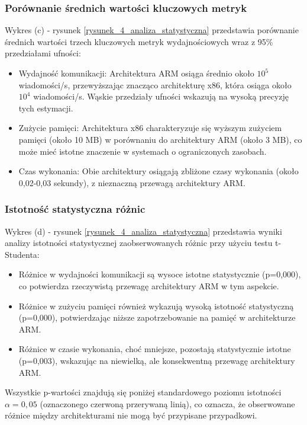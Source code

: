 \subsubsection{Porównanie średnich wartości kluczowych metryk}
Wykres (c) - rysunek \ref{rysunek_4_analiza_statystyczna} przedstawia porównanie średnich wartości trzech kluczowych metryk wydajnościowych wraz z 95\% przedziałami ufności:
\begin{itemize}
    \item Wydajność komunikacji: Architektura ARM osiąga średnio około $10^5$ wiadomości/s, przewyższając znacząco architekturę x86, która osiąga około $10^4$ wiadomości/s. Wąskie przedziały ufności wskazują na wysoką precyzję tych estymacji.
    \item Zużycie pamięci: Architektura x86 charakteryzuje się wyższym zużyciem pamięci (około 10 MB) w porównaniu do architektury ARM (około 3 MB), co może mieć istotne znaczenie w systemach o ograniczonych zasobach.
    \item Czas wykonania: Obie architektury osiągają zbliżone czasy wykonania (około 0,02-0,03 sekundy), z nieznaczną przewagą architektury ARM.
\end{itemize}

\subsubsection{Istotność statystyczna różnic}
Wykres (d) - rysunek \ref{rysunek_4_analiza_statystyczna} przedstawia wyniki analizy istotności statystycznej zaobserwowanych różnic przy użyciu testu t-Studenta:
\begin{itemize}
    \item Różnice w wydajności komunikacji są wysoce istotne statystycznie (p=0,000), co potwierdza rzeczywistą przewagę architektury ARM w tym aspekcie.
    \item Różnice w zużyciu pamięci również wykazują wysoką istotność statystyczną (p=0,000), potwierdzając niższe zapotrzebowanie na pamięć w architekturze ARM.
    \item Różnice w czasie wykonania, choć mniejsze, pozostają statystycznie istotne (p=0,003), wskazując na niewielką, ale konsekwentną przewagę architektury ARM.
\end{itemize}

Wszystkie p-wartości znajdują się poniżej standardowego poziomu istotności $\alpha=0,05$ (oznaczonego czerwoną przerywaną linią), co oznacza, że obserwowane różnice między architekturami nie mogą być przypisane przypadkowi.
